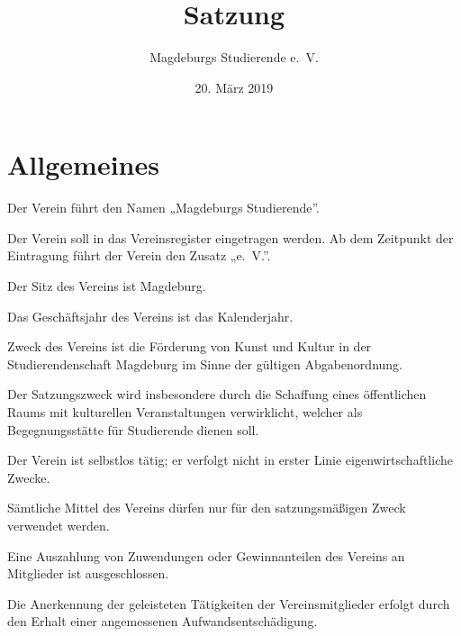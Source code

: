 \documentclass[%
    parskip=half,
]{scrartcl}
\title{Satzung}
\author{Magdeburgs Studierende e. V.}
\date{20. März 2019}
\begin{document}
	
	\maketitle
	
	\tableofcontents
	
	\newpage
	
	\appendix
	
	\section{Allgemeines}
	
	\begin{contract}
	
		
		Der Verein führt den Namen „Magdeburgs Studierende”.
		
		Der Verein soll in das Vereinsregister eingetragen werden. Ab dem Zeitpunkt der Eintragung führt der Verein den Zusatz „e. V.”.
		
		Der Sitz des Vereins ist Magdeburg.
		
		
		Das Geschäftsjahr des Vereins ist das Kalenderjahr.
		
		
		Zweck des Vereins ist die Förderung von Kunst und Kultur in der Studierendenschaft Magdeburg im Sinne der gültigen Abgabenordnung.
		
		Der Satzungszweck wird insbesondere durch die Schaffung eines öffentlichen Raums mit kulturellen Veranstaltungen verwirklicht, welcher als Begegnungsstätte für Studierende dienen soll.
		
		
		Der Verein ist selbstlos tätig; er verfolgt nicht in erster Linie eigenwirtschaftliche Zwecke.
		
		
		Sämtliche Mittel des Vereins dürfen nur für den satzungsmäßigen Zweck verwendet werden.
		
		Eine Auszahlung von Zuwendungen oder Gewinnanteilen des Vereins an Mitglieder ist ausgeschlossen.
		
		Die Anerkennung der geleisteten Tätigkeiten der Vereinsmitglieder erfolgt durch den Erhalt einer angemessenen Aufwandsentschädigung.
		
		

\end{contract}
\end{document}
